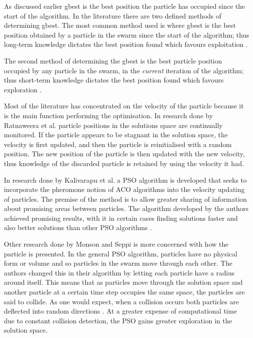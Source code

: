 As discussed earlier gbest is the best position the particle has occupied since the start of the algorithm. In the literature there are two defined methods of determining gbest. The most common method used is where gbest is the best position obtained by a particle in the swarm since the start of the algorithm; thus long-term knowledge dictates the best position found which favours exploitation \cite{CompuIntelligenceIntro,FundamentalSwarm}.

The second method of determining the gbest is the best particle position occupied by any particle in the swarm, in the \emph{current} iteration of the algorithm; thus short-term knowledge dictates the best position found which favours exploration \cite{CompuIntelligenceIntro,FundamentalSwarm}.

Most of the literature has concentrated on the velocity of the particle because it is the main function performing the optimisation. In research done by Ratnaweera et al.\cite{PSOSelfHierarch} particle positions in the solutions space are continually monitored. If the particle appears to be stagnant in the solution space, the velocity is first updated, and then the particle is reinitialised with a random position. The new position of the particle is then updated with the new velocity, thus knowledge of the discarded particle is retained by using the velocity it had\cite{PSOSelfHierarch}.

In research done by Kalivarapu et al. \cite{PSOPheromones} a PSO algorithm is developed that seeks to incorporate the pheromone notion of ACO algorithms into the velocity updating of particles. The premise of the method is to allow greater sharing of information about promising areas between particles. The algorithm developed by the authors achieved promising results, with it in certain cases finding solutions faster and also better solutions than other PSO algorithms \cite{PSOPheromones}. 

Other research done by Monson and Seppi \cite{adaptPSO} is more concerned with how the particle is presented. In the general PSO algorithm, particles have no physical form or volume and so particles in the swarm move through each other. The authors changed this in their algorithm by letting each particle have a radius around itself. This means that as particles move through the solution space and another particle at a certain time step occupies the same space, the particles are said to collide. As one would expect, when a collision occurs both particles are deflected into random directions \cite{adaptPSO}. At a greater expense of computational time due to constant collision detection, the PSO gains greater exploration in the solution space. 

